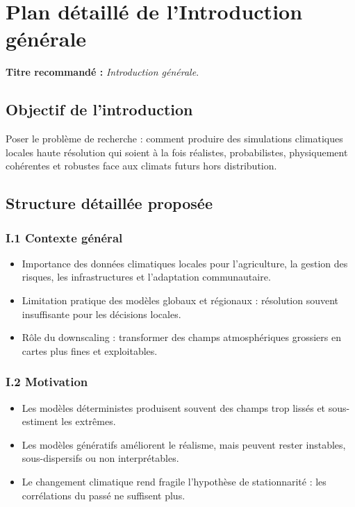 \documentclass[12pt,a4paper]{article}
\begin{document}
\section{Plan d\'etaill\'e de l'Introduction g\'en\'erale}
\textbf{Titre recommand\'e :} \emph{Introduction g\'en\'erale}.

\subsection*{Objectif de l'introduction}
Poser le probl\`eme de recherche : comment produire des simulations climatiques locales haute r\'esolution qui soient \`a la fois r\'ealistes, probabilistes, physiquement coh\'erentes et robustes face aux climats futurs hors distribution.

\subsection*{Structure d\'etaill\'ee propos\'ee}

\subsubsection*{I.1 Contexte g\'en\'eral}
\begin{itemize}
    \item Importance des donn\'ees climatiques locales pour l'agriculture, la gestion des risques, les infrastructures et l'adaptation communautaire.
    \item Limitation pratique des mod\`eles globaux et r\'egionaux : r\'esolution souvent insuffisante pour les d\'ecisions locales.
    \item R\^ole du downscaling : transformer des champs atmosph\'eriques grossiers en cartes plus fines et exploitables.
\end{itemize}

\subsubsection*{I.2 Motivation}
\begin{itemize}
    \item Les mod\`eles d\'eterministes produisent souvent des champs trop liss\'es et sous-estiment les extr\^emes.
    \item Les mod\`eles g\'en\'eratifs am\'eliorent le r\'ealisme, mais peuvent rester instables, sous-dispersifs ou non interpr\'etables.
    \item Le changement climatique rend fragile l'hypoth\`ese de stationnarit\'e : les corr\'elations du pass\'e ne suffisent plus.
\end{itemize}
\end{document}
